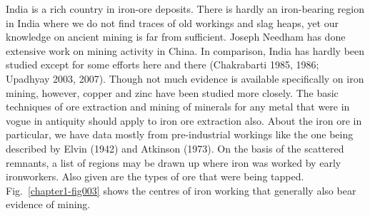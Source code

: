 India is a rich country in iron-ore deposits. There is hardly an iron-bearing region in India where we do not find traces of old workings and slag heaps, yet our knowledge on ancient mining is far from sufficient. Joseph Needham has done extensive work on mining activity in China. In comparison, India has hardly been studied except for some efforts here and there (Chakrabarti 1985, 1986; Upadhyay 2003, 2007). Though not much evidence is available specifically on iron mining, however, copper and zinc have been studied more closely. The basic techniques of ore extraction and mining of minerals for any metal that were in vogue in antiquity should apply to iron ore extraction also. About the iron ore in particular, we have data mostly from pre-industrial workings like the one being described by Elvin (1942) and Atkinson (1973). On the basis of the scattered remnants, a list of regions may be drawn up where iron was worked by early ironworkers. Also given are the types of ore that were being tapped. Fig.~\ref{chapter1-fig003} shows the centres of iron working that generally also bear evidence of mining.

\vspace{-.3cm}

